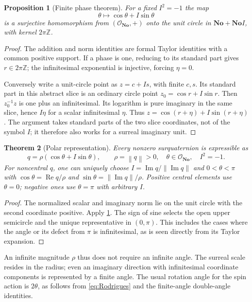 \documentclass[11pt,letterpaper]{article}
\newtheorem{theorem}{Theorem}[section]
\newtheorem{proposition}[theorem]{Proposition}
\theoremstyle{definition}
\newcommand{\No}{\mathbf{No}}
\newcommand{\Z}{\mathbb Z}
\newcommand{\OO}{\mathcal O}
\newcommand{\norm}[1]{\left\lVert#1\right\rVert}
\DeclareMathOperator{\Rea}{Re}
\DeclareMathOperator{\Imag}{Im}
\begin{document}
\begin{proposition}[Finite phase theorem]
\label{prop:finitephase}
For a fixed $I^2=-1$ the map
\[
 \theta\longmapsto\cos\theta+I\sin\theta
\]
is a surjective homomorphism from $(\OO_{\No},+)$ onto the unit circle in
$\No+\No I$, with kernel $2\pi\Z$.
\end{proposition}
\begin{proof}
The addition and norm identities are formal Taylor identities with a common
positive support. If a phase is one, reducing to its standard part gives
$r\in2\pi\Z$; the infinitesimal exponential is injective, forcing $\eta=0$.

Conversely write a unit-circle point as $z=c+Is$, with finite $c,s$. Its
standard part in this abstract slice is an ordinary circle point
$z_0=\cos r+I\sin r$. Then $z_0^{-1}z$ is one plus an infinitesimal. Its logarithm
is pure imaginary in the same slice, hence $I\eta$ for a scalar infinitesimal
$\eta$. Thus $z=\cos(r+\eta)+I\sin(r+\eta)$.
The argument takes standard parts of the two slice coordinates, not of the
symbol $I$; it therefore also works for a surreal imaginary unit.
\end{proof}

\begin{theorem}[Polar representation]
\label{thm:polar}
Every nonzero surquaternion is expressible as
\[
 q=\rho(\cos\theta+I\sin\theta),\qquad
 \rho=\norm q>0,\quad \theta\in\OO_{\No},\quad I^2=-1.
\]
For noncentral $q$, one can uniquely choose
$I=\Imag q/\norm{\Imag q}$ and $0<\theta<\pi$ with
$\cos\theta=\Rea q/\rho$ and $\sin\theta=\norm{\Imag q}/\rho$.
Positive central elements use $\theta=0$; negative ones use $\theta=\pi$ with
arbitrary $I$.
\end{theorem}
\begin{proof}
The normalized scalar and imaginary norm lie on the unit circle with the
second coordinate positive. Apply \cref{prop:finitephase}. The sign of sine
selects the open upper semicircle and the unique representative in $(0,\pi)$.
This includes the cases where the angle or its defect from $\pi$ is
infinitesimal, as is seen directly from its Taylor expansion.
\end{proof}
An infinite magnitude $\rho$ thus does not require an infinite angle. The
surreal scale resides in the radius; even an imaginary direction with
infinitesimal coordinate components is represented by a finite angle. The
usual rotation angle for the spin action is $2\theta$, as follows from
\eqref{eq:Rodrigues} and the finite-angle double-angle identities.
\end{document}
